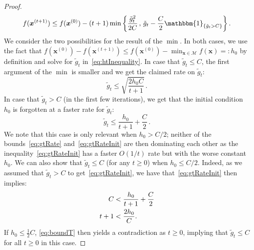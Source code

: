 \documentclass{article}
\newcommand{\x}{\bm{x}}
\newcommand{\domain}{\mathcal{M}} %
\newcommand{\indic}{\mathbbm{1}} %
\newcommand{\0}{\mathbf{0}} %
\begin{document}
\begin{proof}
\begin{equation} \label{eq:htInequality}
f(\x^{(t+1)})  \leq f(\x^{(0)}) - (t+1) \min\left\{ \frac{{\tilde{g}_t}^2}{2 C} \, ,\, \tilde{g}_t - \frac{C}{2} \indic_{ \{\tilde{g}_t > C \}} \right\}.
\end{equation}
We consider the two possibilities for the result of the $\min$. In both cases, we use the fact that $f(\x^{(0)}) - f(\x^{(t+1)}) \leq f(\x^{(0)}) - \min_{\x \in \domain} f(\x) =: h_0$ by definition and solve for $\tilde{g}_t$ in~\eqref{eq:htInequality}. In case that $\tilde{g}_t \leq C$, the first argument of the $\min$ is smaller and we get the claimed rate on $\tilde{g}_t$:
\begin{equation} \label{eq:gtRate}
\tilde{g}_t \leq \sqrt{ \frac{2 h_0 C}{t+1} } \,  .
\end{equation} 
In case that $\tilde{g}_t > C$ (in the first few iterations), we get that the initial condition $h_0$ is forgotten at a faster rate for $\tilde{g}_t$:
\begin{equation} \label{eq:gtRateInit}
\tilde{g}_t \leq  \frac{h_0}{t+1} + \frac{C}{2} \, .
\end{equation}
We note that this case is only relevant when $h_0 > C/2$; neither of the bounds~\eqref{eq:gtRate} and~\eqref{eq:gtRateInit} are then dominating each other as the inequality~\eqref{eq:gtRateInit} has a faster $O(1/t)$ rate but with the worse constant~$h_0$. We can also show that $\tilde{g}_t \leq C$ (for any $t \geq 0$) when $h_0 \leq C/2$. Indeed,
as we assumed that $\tilde{g}_t  > C$ to get~\eqref{eq:gtRateInit}, we have that~\eqref{eq:gtRateInit} then implies:
\begin{align}
C &< \frac{h_0}{t+1} + \frac{C}{2} \notag \\
t+1 &< \frac{2 h_0}{C} .  \label{eq:boundT}
\end{align}
If $h_0 \leq \frac{1}{2} C$, \eqref{eq:boundT} then yields a contradiction as $t \geq 0$, implying that $\tilde{g}_{t} \leq C$ for all $t\geq 0$ in this case.


\end{proof}
\end{document}
